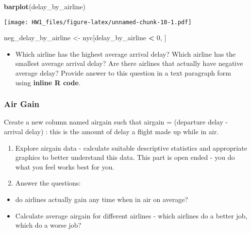 \documentclass[
]{article}
\newenvironment{Shaded}{\begin{snugshade}}{\end{snugshade}}
\newcommand{\DecValTok}[1]{\textcolor[rgb]{0.00,0.00,0.81}{#1}}
\newcommand{\KeywordTok}[1]{\textcolor[rgb]{0.13,0.29,0.53}{\textbf{#1}}}
\newcommand{\NormalTok}[1]{#1}
\newcommand{\OperatorTok}[1]{\textcolor[rgb]{0.81,0.36,0.00}{\textbf{#1}}}
\newcommand{\StringTok}[1]{\textcolor[rgb]{0.31,0.60,0.02}{#1}}
\providecommand{\tightlist}{%
  \setlength{\itemsep}{0pt}\setlength{\parskip}{0pt}}
\begin{document}
\begin{Shaded}
\begin{Highlighting}[]
\KeywordTok{barplot}\NormalTok{(delay_by_airline)}
\end{Highlighting}
\end{Shaded}

\texttt{[image: HW1\_files/figure-latex/unnamed-chunk-10-1.pdf]}

\begin{Shaded}
\begin{Highlighting}[]
\NormalTok{neg_delay_by_airline <-}\StringTok{ }\NormalTok{nyc[delay_by_airline }\OperatorTok{<}\StringTok{ }\DecValTok{0}\NormalTok{, ]}
\end{Highlighting}
\end{Shaded}

\begin{itemize}
\tightlist
\item
  Which airline has the highest average arrival delay? Which airline has
  the smallest average arrival delay? Are there airlines that actually
  have negative average delay? Provide answer to this question in a text
  paragraph form using \textbf{inline R code}.
\end{itemize}

\hypertarget{air-gain}{%
\subsubsection{Air Gain}\label{air-gain}}

Create a new column named airgain such that airgain = (departure delay -
arrival delay) : this is the amount of delay a flight made up while in
air.

\begin{enumerate}
\def\labelenumi{\alph{enumi})}
\item
  Explore airgain data - calculate suitable descriptive statistics and
  appropriate graphics to better understand this data. This part is open
  ended - you do what you feel works best for you.
\item
  Answer the questions:
\end{enumerate}

\begin{itemize}
\item
  do airlines actually gain any time when in air on average?
\item
  Calculate average airgain for different airlines - which airlines do a
  better job, which do a worse job?
\end{itemize}
\end{document}
